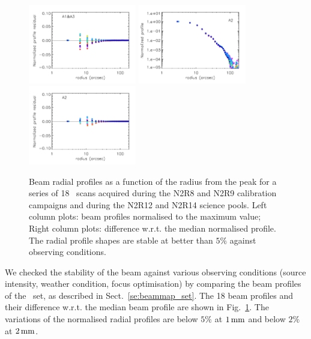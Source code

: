 \begin{figure}[ht!]
   \includegraphics[clip, width=0.42\textwidth]{Figures/Beams/plot_profile_diff_wrt_median_1mm.pdf}
   \includegraphics[clip, width=0.42\textwidth]{Figures/Beams/plot_profiles_a2.pdf}
   \includegraphics[clip, width=0.42\textwidth]{Figures/Beams/plot_profile_diff_wrt_median_a2.pdf}
  \caption[Stability of the beam profile]{Beam radial profiles as a
    function of the radius from the peak for a series of 18
    \bm\ scans acquired during the N2R8 and N2R9 calibration campaigns and
    during the N2R12 and N2R14 science pools. Left column plots: 
    beam profiles normalised to the maximum value; Right column plots:
    difference w.r.t. the median normalised profile. The radial
    profile shapes are stable at better than $5\%$ 
    against observing conditions.}
  \label{fig:beam_prof}
\end{figure}
We checked the stability of the beam against various observing
conditions (source intensity, weather condition, focus optimisation) by
comparing the beam profiles of the \bm\ set, as described in
Sect.~\ref{se:beammap_set}. The 18 beam profiles and their difference
w.r.t. the median beam profile are shown in Fig.~\ref{fig:beam_prof}.
The variations of the normalised radial profiles are below $5\%$ at
$1\,\rm{mm}$ and below $2\%$ at $2\,\rm{mm}$. 

